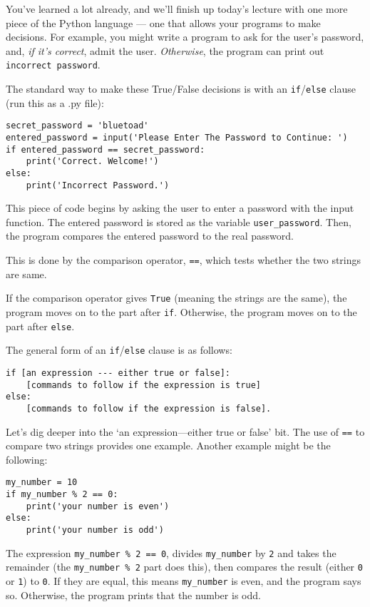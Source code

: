 You’ve learned a lot already, and we’ll finish up today’s lecture with one more piece of the Python language --- one that allows your programs to make decisions. For example, you might write a program to ask for the user’s password, and, \emph{if it’s correct}, admit the user. \emph{Otherwise}, the program can print out \texttt{\textquotesingle incorrect password\textquotesingle}.

The standard way to make these True/False decisions is with an \texttt{if}/\texttt{else} clause (run this as a .py file):

\begin{lstlisting}
secret_password = 'bluetoad'
entered_password = input('Please Enter The Password to Continue: ')
if entered_password == secret_password:
	print('Correct. Welcome!')
else:
	print('Incorrect Password.')
\end{lstlisting}

This piece of code begins by asking the user to enter a password with the input function. The entered password is stored as the variable \texttt{user\_password}. Then, the program compares the entered password to the real password.

This is done by the comparison operator, \texttt{==}, which tests whether the two strings are same.

If the comparison operator gives \texttt{True} (meaning the strings are the same), the program moves on to the part after \texttt{if}. Otherwise, the program moves on to the part after \texttt{else}.

The general form of an \texttt{if}/\texttt{else} clause is as follows:

\begin{verbatim}
if [an expression --- either true or false]:
    [commands to follow if the expression is true]
else:
    [commands to follow if the expression is false].
\end{verbatim}

Let’s dig deeper into the `an expression—either true or false' bit. The use of \texttt{==} to compare two strings provides one example. Another example might be the following:

\begin{lstlisting}
my_number = 10
if my_number % 2 == 0:
	print('your number is even')
else:
	print('your number is odd')
\end{lstlisting}

The expression \texttt{my\_number \% 2 == 0}, divides \texttt{my\_number} by \texttt{2} and takes the remainder (the \texttt{my\_number \% 2} part does this), then compares the result (either \texttt{0} or \texttt{1}) to \texttt{0}. If they are equal, this means \texttt{my\_number} is even, and the program says so. Otherwise, the program prints that the number is odd.  

